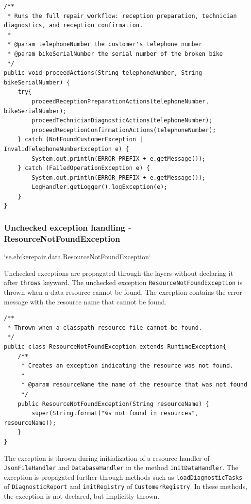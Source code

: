 \documentclass[a4paper]{scrartcl}
\begin{document}
\begin{lstlisting}[style=javastyle, caption={View.proceedActions catching exceptions and displaying error messages}]
/**
 * Runs the full repair workflow: reception preparation, technician diagnostics, and reception confirmation.
 *
 * @param telephoneNumber the customer's telephone number
 * @param bikeSerialNumber the serial number of the broken bike
 */
public void proceedActions(String telephoneNumber, String bikeSerialNumber) {
    try{
        proceedReceptionPreparationActions(telephoneNumber, bikeSerialNumber);
        proceedTechnicianDiagnosticActions(telephoneNumber);
        proceedReceptionConfirmationActions(telephoneNumber);
    } catch (NotFoundCustomerException | InvalidTelephoneNumberException e) {
        System.out.println(ERROR_PREFIX + e.getMessage());
    } catch (FailedOperationException e) {
        System.out.println(ERROR_PREFIX + e.getMessage());
        LogHandler.getLogger().logException(e);
    }
}
\end{lstlisting}

\subsubsection{Unchecked exception handling - ResourceNotFoundException}

`se.ebikerepair.data.ResourceNotFoundException`

Unchecked exceptions are propagated through the layers without declaring it after \texttt{throws} keyword. The unchecked exception \texttt{ResourceNotFoundException} is thrown when a data resource cannot be found. The exception contains the error message with the resource name that cannot be found.

\begin{lstlisting}[style=javastyle, caption={Unchecked Exception ResourceNotFoundException class}]
/**
 * Thrown when a classpath resource file cannot be found.
 */
public class ResourceNotFoundException extends RuntimeException{
    /**
     * Creates an exception indicating the resource was not found.
     *
     * @param resourceName the name of the resource that was not found
     */
    public ResourceNotFoundException(String resourceName) {
        super(String.format("%s not found in resources", resourceName));
    }
}
\end{lstlisting}

The exception is thrown during initialization of a resource handler of \texttt{JsonFileHandler} and \texttt{DatabaseHandler} in the method \texttt{initDataHandler}. The exception is propagated further through methods such as \texttt{loadDiagnosticTasks} of \texttt{DiagnosticReport} and \texttt{initRegistry} of \texttt{CustomerRegistry}. In these methods, the exception is not declared, but implicitly thrown.
\end{document}
